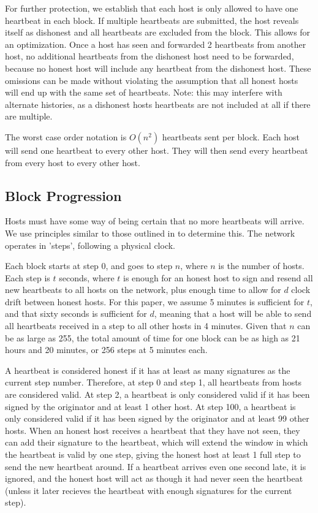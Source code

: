 \documentclass[twocolumn]{article}
\begin{document}
For further protection, we establish that each host is only allowed to have one heartbeat in each block.
If multiple heartbeats are submitted, the host reveals itself as dishonest and all heartbeats are excluded from the block.
This allows for an optimization.
Once a host has seen and forwarded 2 heartbeats from another host, no additional heartbeats from the dishonest host need to be forwarded, because no honest host will include any heartbeat from the dishonest host.
These omissions can be made without violating the assumption that all honest hosts will end up with the same set of heartbeats.
Note: this may interfere with alternate histories, as a dishonest hosts heartbeats are not included at all if there are multiple.

The worst case order notation is $O(n^2)$ heartbeats sent per block.
Each host will send one heartbeat to every other host.
They will then send every heartbeat from every host to every other host.

\subsection{Block Progression}
Hosts must have some way of being certain that no more heartbeats will arrive.
We use principles similar to those outlined in \cite{timeout} to determine this.
The network operates in 'steps', following a physical clock.

Each block starts at step 0, and goes to step $n$, where $n$ is the number of hosts.
Each step is $t$ seconds, where $t$ is enough for an honest host to sign and resend all new heartbeats to all hosts on the network, plus enough time to allow for $d$ clock drift between honest hosts.
For this paper, we assume 5 minutes is sufficient for $t$, and that sixty seconds is sufficient for $d$, meaning that a host will be able to send all heartbeats received in a step to all other hosts in 4 minutes.
Given that $n$ can be as large as 255, the total amount of time for one block can be as high as 21 hours and 20 minutes, or 256 steps at 5 minutes each.

A heartbeat is considered honest if it has at least as many signatures as the current step number.
Therefore, at step 0 and step 1, all heartbeats from hosts are considered valid.
At step 2, a heartbeat is only considered valid if it has been signed by the originator and at least 1 other host.
At step 100, a heartbeat is only considered valid if it has been signed by the originator and at least 99 other hosts.
When an honest host receives a heartbeat that they have not seen, they can add their signature to the heartbeat, which will extend the window in which the heartbeat is valid by one step, giving the honest host at least 1 full step to send the new heartbeat around.
If a heartbeat arrives even one second late, it is ignored, and the honest host will act as though it had never seen the heartbeat (unless it later recieves the heartbeat with enough signatures for the current step).
\end{document}
